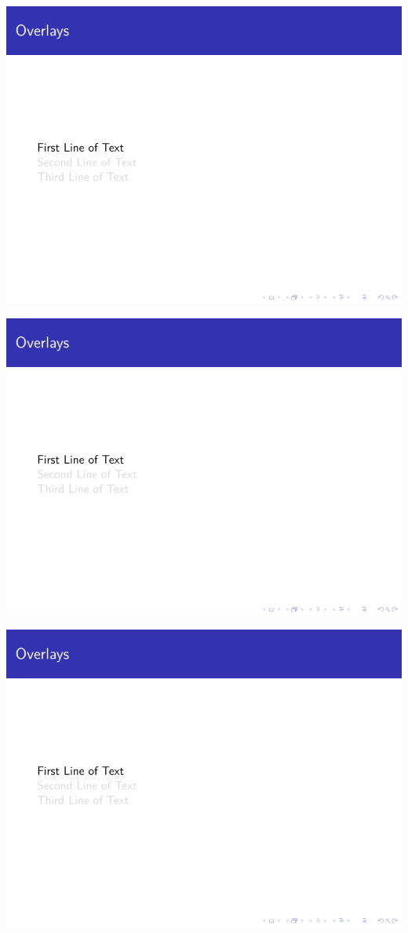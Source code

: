 \begin{column}{0.5\textwidth}
\includegraphics[page=1]{examples/beamer/beameroverlay05.pdf}

\includegraphics[page=2]{examples/beamer/beameroverlay05.pdf}

\includegraphics[page=3]{examples/beamer/beameroverlay05.pdf}


\end{column}
